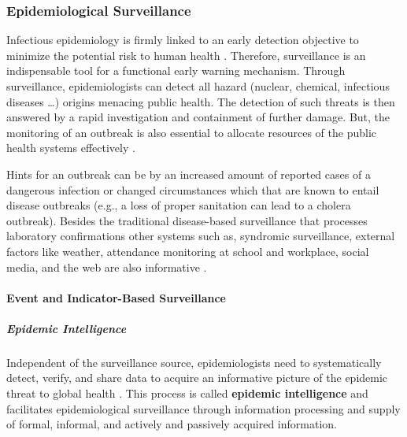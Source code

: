 \subsubsection{Epidemiological Surveillance}
Infectious epidemiology is firmly linked to an early detection objective to minimize the potential risk to human health \citep{EarlyDetection}.
Therefore, surveillance is an indispensable tool for a functional early warning mechanism.
Through surveillance, epidemiologists can detect all hazard (nuclear, chemical, infectious diseases \ldots) origins menacing public health.
The detection of such threats is then answered by a rapid investigation and containment of further damage.
But, the monitoring of an outbreak is also essential to allocate resources of the public health systems effectively \citep{EarlyDetection}.

Hints for an outbreak can be by an increased amount of reported cases of a dangerous infection or changed circumstances which that are known to entail disease outbreaks (e.g., a loss of proper sanitation can lead to a cholera outbreak).
Besides the traditional disease-based surveillance that processes laboratory confirmations other systems such as, syndromic surveillance, external factors like weather, attendance monitoring at school and workplace, social media, and the web are also informative \citep{EarlyDetection}.

\paragraph{Event and Indicator-Based Surveillance}

\subparagraph{Epidemic Intelligence}
Independent of the surveillance source, epidemiologists need to systematically detect, verify, and share data to acquire an informative picture of the epidemic threat to global health \citep{EarlyDetection}.
This process is called \textbf{epidemic intelligence} and facilitates epidemiological surveillance through information processing and supply of formal, informal, and actively and passively acquired information.



